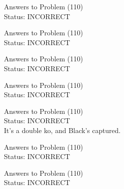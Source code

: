 \documentclass[11pt]{article}
\begin{document}
\begin{minipage}[t]{0.5\textwidth}
  {\centering
  
  Answers to Problem (110)\\
  Status: INCORRECT\\
  
  }
\end{minipage}
\begin{minipage}[t]{0.5\textwidth}
  {\centering
  
  Answers to Problem (110)\\
  Status: INCORRECT\\
  
  }
\end{minipage}
\begin{minipage}[t]{0.5\textwidth}
  {\centering
  
  Answers to Problem (110)\\
  Status: INCORRECT\\
  
  }
\end{minipage}
\begin{minipage}[t]{0.5\textwidth}
  {\centering
  
  Answers to Problem (110)\\
  Status: INCORRECT\\
  
  }
\end{minipage}
\begin{minipage}[t]{0.5\textwidth}
  {\centering
  
  Answers to Problem (110)\\
  Status: INCORRECT\\
  It's a double ko, and Black's captured.\\
  }
\end{minipage}
\begin{minipage}[t]{0.5\textwidth}
  {\centering
  
  Answers to Problem (110)\\
  Status: INCORRECT\\
  
  }
\end{minipage}
\begin{minipage}[t]{0.5\textwidth}
  {\centering
  
  Answers to Problem (110)\\
  Status: INCORRECT\\
  
  }
\end{minipage}
\end{document}
